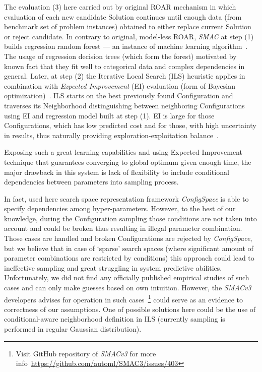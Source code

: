 The evaluation (3) here carried out by original ROAR mechanism in which evaluation of each new candidate Solution continues until enough data (from benchmark set of problem instances) obtained to either replace current Solution or reject candidate. In contrary to original, model-less ROAR, \textit{SMAC} at step (1) builds regression random forest — an instance of machine learning algorithm~\cite{breiman2001random}. The usage of regression decision trees (which form the forest) motivated by known fact that they fit well to categorical data and complex dependencies in general. Later, at step (2) the Iterative Local Search (ILS) heuristic applies in combination with \textit{Expected Improvement} (EI) evaluation (form of Bayesian optimization)~\cite{shahriari2015taking}. ILS starts on the best previously found Configuration and traverses its Neighborhood distinguishing between neighboring Configurations using EI and regression model built at step (1). EI is large for those Configurations, which has low predicted cost and for those, with high uncertainty in results, thus naturally providing exploration-exploitation balance~\cite{jones1998efficient}.

Exposing such a great learning capabilities and using Expected Improvement technique that guarantees converging to global optimum given enough time, the major drawback in this system is lack of flexibility to include conditional dependencies between parameters into sampling process. 

In fact, used here search space representation framework \textit{ConfigSpace}\cite{configspace} is able to specify dependencies among hyper-parameters. However, to the best of our knowledge, during the Configuration sampling those conditions are not taken into account and could be broken thus resulting in illegal parameter combination. Those cases are handled and broken Configurations are rejected by \textit{ConfigSpace}, but we believe that in case of `sparse' search spaces (where significant amount of parameter combinations are restricted by conditions) this approach could lead to ineffective sampling and great struggling in system predictive abilities. Unfortunately, we did not find any officially published empirical studies of such cases and can only make guesses based on own intuition. However, the \textit{SMACv3} developers advises for operation in such cases~\footnote{Visit GitHub repository of \textit{SMACv3} for more info~\url{https://github.com/automl/SMAC3/issues/403}} could serve as an evidence to correctness of our assumptions. One of possible solutions here could be the use of conditional-aware neighborhood definition in ILS (currently sampling is performed in regular Gaussian distribution). 

